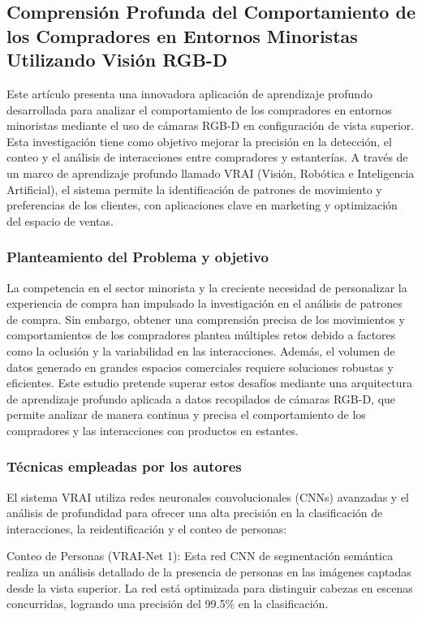 \subsection{Comprensión Profunda del Comportamiento de los Compradores en Entornos Minoristas Utilizando Visión RGB-D}

Este artículo presenta una innovadora aplicación de aprendizaje profundo desarrollada para analizar el comportamiento de los compradores en entornos minoristas mediante el uso de cámaras RGB-D en configuración de vista superior. Esta investigación tiene como objetivo mejorar la precisión en la detección, el conteo y el análisis de interacciones entre compradores y estanterías. A través de un marco de aprendizaje profundo llamado VRAI (Visión, Robótica e Inteligencia Artificial), el sistema permite la identificación de patrones de movimiento y preferencias de los clientes, con aplicaciones clave en marketing y optimización del espacio de ventas.




\subsubsection{Planteamiento del Problema y objetivo }
La competencia en el sector minorista y la creciente necesidad de personalizar la experiencia de compra han impulsado la investigación en el análisis de patrones de compra. Sin embargo, obtener una comprensión precisa de los movimientos y comportamientos de los compradores plantea múltiples retos debido a factores como la oclusión y la variabilidad en las interacciones. Además, el volumen de datos generado en grandes espacios comerciales requiere soluciones robustas y eficientes. Este estudio pretende superar estos desafíos mediante una arquitectura de aprendizaje profundo aplicada a datos recopilados de cámaras RGB-D, que permite analizar de manera continua y precisa el comportamiento de los compradores y las interacciones con productos en estantes.


\subsubsection{Técnicas empleadas por los autores}
El sistema VRAI utiliza redes neuronales convolucionales (CNNs) avanzadas y el análisis de profundidad para ofrecer una alta precisión en la clasificación de interacciones, la reidentificación y el conteo de personas:

Conteo de Personas (VRAI-Net 1): Esta red CNN de segmentación semántica realiza un análisis detallado de la presencia de personas en las imágenes captadas desde la vista superior. La red está optimizada para distinguir cabezas en escenas concurridas, logrando una precisión del 99.5\% en la clasificación.

